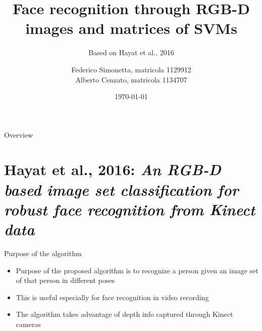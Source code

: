 \documentclass[unknownkeysallowed]{beamer}
\title{Face recognition through RGB-D images and matrices of SVMs} %
\subtitle{Based on Hayat et al., 2016}
\date{\today}
\author{Federico Simonetta, matricola 1129912 \\ Alberto Cenzato, matricola 1134707 }
\begin{document}
\maketitle
{}

\begin{frame}{Overview}
	\vspace*{6mm}
\end{frame}

\section{Hayat et al., 2016: \textit{An RGB-D based image set classification
for robust face recognition from Kinect data}}
\begin{frame}{Purpose of the algorithm}
	\begin{itemize}
		\item Purpose of the proposed algorithm is to recognize a person
			given an image set of that person in different poses
		\item This is useful especially for face recognition in video
			recording
		\item The algorithm takes advantage of depth info captured
			through Kinect cameras
	\end{itemize}

\end{frame}
\end{document}
